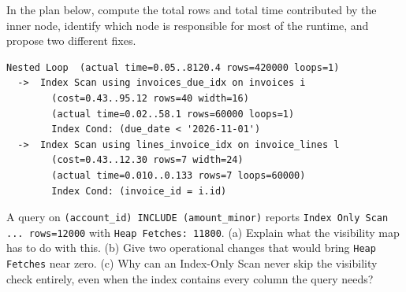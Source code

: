 \begin{exercise}
In the plan below, compute the total rows and total time contributed by the inner node, identify which node is responsible for most of the runtime, and propose two different fixes.
\begin{lstlisting}[language=Plain]
Nested Loop  (actual time=0.05..8120.4 rows=420000 loops=1)
  ->  Index Scan using invoices_due_idx on invoices i
        (cost=0.43..95.12 rows=40 width=16)
        (actual time=0.02..58.1 rows=60000 loops=1)
        Index Cond: (due_date < '2026-11-01')
  ->  Index Scan using lines_invoice_idx on invoice_lines l
        (cost=0.43..12.30 rows=7 width=24)
        (actual time=0.010..0.133 rows=7 loops=60000)
        Index Cond: (invoice_id = i.id)
\end{lstlisting}
\end{exercise}

\begin{exercise}
A query on \texttt{(account\_id) INCLUDE (amount\_minor)} reports \texttt{Index Only Scan ... rows=12000} with \texttt{Heap Fetches: 11800}. (a) Explain what the visibility map has to do with this. (b) Give two operational changes that would bring \texttt{Heap Fetches} near zero. (c) Why can an Index-Only Scan never skip the visibility check entirely, even when the index contains every column the query needs?
\end{exercise}

